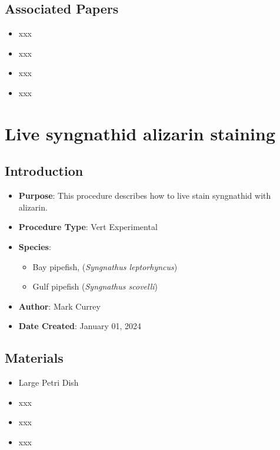 \documentclass[
  letterpaper,
  DIV=11,
  numbers=noendperiod]{scrreprt}
\providecommand{\tightlist}{%
  \setlength{\itemsep}{0pt}\setlength{\parskip}{0pt}}\usepackage{longtable,booktabs,array}
\begin{document}
\hypertarget{associated-papers-37}{%
\section{Associated Papers}\label{associated-papers-37}}

\begin{itemize}
\tightlist
\item
  xxx
\item
  xxx
\item
  xxx
\item
  xxx
\end{itemize}

\hypertarget{sec-vert_exp_live_alizarin_syngnathid}{%
\chapter{Live syngnathid alizarin
staining}\label{sec-vert_exp_live_alizarin_syngnathid}}

\hypertarget{introduction-62}{%
\section{Introduction}\label{introduction-62}}

\begin{itemize}
\tightlist
\item
  \textbf{Purpose}: This procedure describes how to live stain
  syngnathid with alizarin.
\item
  \textbf{Procedure Type}: Vert Experimental
\item
  \textbf{Species}:

  \begin{itemize}
  \tightlist
  \item
    Bay pipefish, (\emph{Syngnathus leptorhyncus})
  \item
    Gulf pipefish (\emph{Syngnathus scovelli})
  \end{itemize}
\item
  \textbf{Author}: Mark Currey
\item
  \textbf{Date Created}: January 01, 2024
\end{itemize}

\hypertarget{materials-57}{%
\section{Materials}\label{materials-57}}

\begin{itemize}
\tightlist
\item
  Large Petri Dish
\item
  xxx
\item
  xxx
\item
  xxx
\end{itemize}
\end{document}
